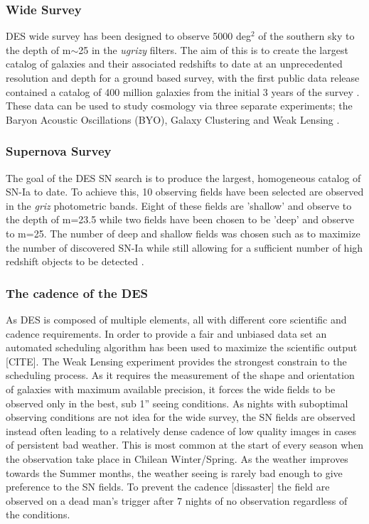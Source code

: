 \subsubsection{Wide Survey}
DES wide survey has been designed to observe 5000 deg$^2$ of the southern sky to the depth of m$\sim$25 in the \textit{ugrizy} filters. The aim of this is to create the largest catalog of galaxies and their associated redshifts to date at an unprecedented resolution and depth for a ground based survey, with the first public data release contained a catalog of 400 million galaxies from the initial 3 years of the survey \citep{DES2018}. These data can be used to study cosmology via three separate experiments; the Baryon Acoustic Oscillations (BYO), Galaxy Clustering and Weak Lensing \citep{DES2016,Prat2017,Drlica-Wagner2017,DES2017}.

\subsubsection{Supernova Survey}
The goal of the DES SN search is to produce the largest, homogeneous catalog of SN-Ia to date. To achieve this, 10 observing fields have been selected are observed in the \textit{griz} photometric bands. Eight of these fields are 'shallow' and observe to the depth of m=23.5 while two fields have been chosen to be 'deep' and observe to m=25. The number of deep and shallow fields was chosen such as to maximize the number of discovered SN-Ia while still allowing for a sufficient number of high redshift objects to be detected \citep{Bernstein2012}.

\subsubsection{The cadence of the DES}
As DES is composed of multiple elements, all with different core scientific and cadence requirements. In order to provide a fair and unbiased data set an automated scheduling algorithm has been used to maximize the scientific output [CITE]. The Weak Lensing experiment provides the strongest constrain to the scheduling process. As it requires the measurement of the shape and orientation of galaxies with maximum available precision, it forces the wide fields to be observed only in the best, sub 1'' seeing conditions. As nights with suboptimal observing conditions are not idea for the wide survey, the SN fields are observed instead often leading to a relatively dense cadence of low quality images in cases of persistent bad weather. This is most common at the start of every season when the observation take place in Chilean Winter/Spring. As the weather improves towards the Summer months, the weather seeing is rarely bad enough to give preference to the SN fields. To prevent the cadence [dissaster] the field are observed on a dead man's trigger after 7 nights of no observation regardless of the conditions.

